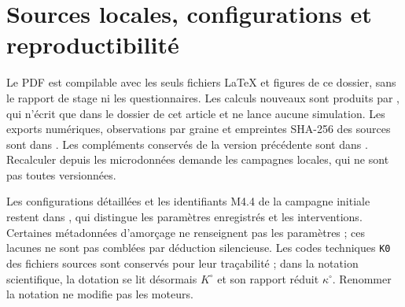 \section{Sources locales, configurations et reproductibilité}\label{sec:sources_revision}
Le PDF est compilable avec les seuls fichiers LaTeX et figures
de ce dossier, sans le rapport de stage ni les questionnaires.
Les calculs nouveaux sont produits par
, qui n'écrit que dans
le dossier de cet article et ne lance aucune simulation.
Les exports numériques, observations par graine et empreintes
SHA-256 des sources sont dans .
Les compléments conservés de la version précédente sont dans
. Recalculer depuis les microdonnées
demande les campagnes locales, qui ne sont pas toutes versionnées.



Les configurations détaillées et les identifiants M4.4 de la
campagne initiale restent dans
, qui distingue les paramètres
enregistrés et les interventions. Certaines métadonnées d'amorçage
ne renseignent pas les paramètres ; ces lacunes ne sont pas comblées
par déduction silencieuse.
Les codes techniques \texttt{K0} des fichiers sources sont
conservés pour leur traçabilité ; dans la notation scientifique,
la dotation se lit désormais $K^\circ$ et son rapport réduit
$\kappa^\circ$. Renommer la notation ne modifie pas les moteurs.


